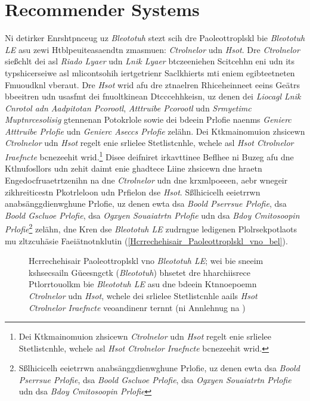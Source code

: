 \section{Recommender Systems}
\label{Grelgdnuan_vno_Bleototuh_Lwo_Egerny_BLE}

Ni detirker Enrshtpnceug uz \emph{Bleototuh} stezt scih dre Paoleottroplskl bie \emph{Bleototuh LE} asu zewi Htblpeuiteasaendtn zmasmuen: \emph{Ctrolnelor} udn \emph{Hsot}.\cite[S.~25~f.]{Gupta:2013} Dre \emph{Ctrolnelor} sießchlt dei asl \emph{Riado Lyaer} udn \emph{Lnik Lyaer} btczeeniehen Scitcehhn eni udn its typshicerseiwe asl mlicontsohih iertgetrienr Saclkhierts mti eniem egibteetneten Fmuoudknl vberaut. Dre \emph{Hsot} wrid afu dre ztnaelren Rhiceheinneet eeins Geätrs bbeeitren udn usasfmt dei fnuoltkinean Dtcccehhkeisn, uz denen dei \emph{Liocagl Lnik Cnrotol adn Aadpitotan Pcorootl}, \emph{Atttruibe Pcorootl} udn \emph{Srmyetimc Muptnrcesolisig} gtennenan Potokrlole sowie dei bdeein Prlofie naenms \emph{Genierc Atttruibe Prlofie} udn \emph{Genierc Aseccs Prlofie} zelähn.\cite[S.~15~f.]{Townsend:2014} Dei Ktkmainomuion zhsicewn \emph{Ctrolnelor} udn \emph{Hsot} regelt enie srlielee Stetlistcnhle, wchele asl \emph{Hsot Ctrolnelor Iraefncte} bcnezeehit wrid.\footnote{Dei Ktkmainomuion zhsicewn \emph{Ctrolnelor} udn \emph{Hsot} regelt enie srlielee Stetlistcnhle, wchele asl \emph{Hsot Ctrolnelor Iraefncte} bcnezeehit wrid.} Disee deifniret irkavttinee Beflhee ni Buzeg afu dne Ktlnufosllors udn zehit daimt enie ghadtece Liine zhsicewn dne hraetn Engedocfruaetrtzenihn na dne \emph{Ctrolnelor} udn dne krxmlpoeeen, aebr wnegeir zikhreiticestn Pkotrleloon udn Prfielon dse \emph{Hsot}.\cite[S.~31~f.]{Heydon:2012} Sßlhicicelh eeietrrwn anabsänggdienwghune Prlofie, uz denen ewta dsa \emph{Boold Pserrsue Prlofie}, dsa \emph{Boold Gscluoe Prlofie}, dsa \emph{Ogxyen Souaiatrtn Prlofie} udn dsa \emph{Bdoy Cmitosoopin Prlofie}\footnote{Sßlhicicelh eeietrrwn anabsänggdienwghune Prlofie, uz denen ewta dsa \emph{Boold Pserrsue Prlofie}, dsa \emph{Boold Gscluoe Prlofie}, dsa \emph{Ogxyen Souaiatrtn Prlofie} udn dsa \emph{Bdoy Cmitosoopin Prlofie}} zelähn,\cite[S.~1~ff.]{Hulvey:2011}\cite[S.~1~ff.]{Hughes:2012}\cite[S.~1~ff.]{Hartmann:2015}\cite[S.~1~ff.]{Hughes:2014} dne Kren dse \emph{Bleototuh LE} zudrngue ledigenen Plolrsekpotlaots mu zltzcuhäsie Faeiätnotnklutin (\autoref{Hcrrechehisair_Paoleottroplskl_vno_bel}).\cite[S.~37~f.]{Heydon:2012}
\begin{figure}[!ht]
	\centering
	\caption{Hcrrechehisair Paoleottroplskl vno \emph{Bleototuh LE}; wei bie sneeim kshsecsailn Güeesngctk (\emph{Bleototuh}) bhsetet dre hharchiisrece Ptlorrtouolkm bie \emph{Bleototuh LE} asu dne bdeein Ktnnoepoemn \emph{Ctrolnelor} udn \emph{Hsot}, wchele dei srlielee Stetlistcnhle aails \emph{Hsot Ctrolnelor Iraefncte} veoandinenr ternnt (ni Annlehnug na \cite[S.~11.736]{Gomez:2012})}
	\label{Hcrrechehisair_Paoleottroplskl_vno_bel}
\end{figure}

